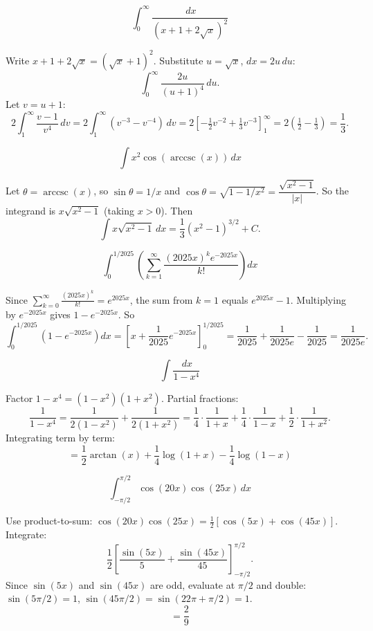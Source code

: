 \begin{questions}

\question
\[ \int_0^\infty \frac{\,dx}{(x+1+2\sqrt{x})^2} \]
\begin{solution}
Write $x+1+2\sqrt{x}=(\sqrt{x}+1)^2$. Substitute $u=\sqrt{x}$, $dx=2u\,du$:
\[ \int_0^\infty \frac{2u}{(u+1)^4}\,du. \]
Let $v=u+1$: 
\[
2\int_1^\infty \frac{v-1}{v^4}\,dv = 2\int_1^\infty (v^{-3}-v^{-4})\,dv = 2\left[-\tfrac12 v^{-2}+\tfrac13 v^{-3}\right]_1^\infty = 2\left(\tfrac12-\tfrac13\right)=\frac13.\]
\end{solution}

\question
\[ \int x^2\cos(\operatorname{arccsc}(x))\,dx \]
\begin{solution}
Let $\theta=\operatorname{arccsc}(x)$, so $\sin\theta=1/x$ and $\cos\theta=\sqrt{1-1/x^2}=\dfrac{\sqrt{x^2-1}}{|x|}$.
So the integrand is $x\sqrt{x^2-1}$ (taking $x>0$). Then
\[ \int x\sqrt{x^2-1}\,dx = \frac13(x^2-1)^{3/2}+C. \]
\end{solution}

\question
\[ \int_0^{1/2025}\left(\sum_{k=1}^\infty \frac{(2025x)^k e^{-2025x}}{k!}\right)dx \]
\begin{solution}
Since $\sum_{k=0}^\infty \frac{(2025x)^k}{k!}=e^{2025x}$, the sum from $k=1$ equals $e^{2025x}-1$. Multiplying by $e^{-2025x}$ gives $1-e^{-2025x}$. So
\[ \int_0^{1/2025}\left(1-e^{-2025x}\right)dx = \left[x+\frac{1}{2025}e^{-2025x}\right]_0^{1/2025} = \frac{1}{2025}+\frac{1}{2025e}-\frac{1}{2025}=\frac{1}{2025e}. \]
\end{solution}

\question
\[ \int \frac{\,dx}{1-x^4} \]
\begin{solution}
Factor $1-x^4=(1-x^2)(1+x^2)$. Partial fractions:
\[ \frac{1}{1-x^4}=\frac{1}{2(1-x^2)}+\frac{1}{2(1+x^2)} = \frac{1}{4}\cdot\frac{1}{1+x}+\frac14\cdot\frac{1}{1-x}+\frac12\cdot\frac{1}{1+x^2}.\]
Integrating term by term:
\[ = \frac12\arctan(x)+\frac14\log(1+x)-\frac14\log(1-x) \]
\end{solution}

\question
\[ \int_{-\pi/2}^{\pi/2}\cos(20x)\cos(25x)\,dx \]
\begin{solution}
Use product-to-sum: $\cos(20x)\cos(25x)=\tfrac12[\cos(5x)+\cos(45x)]$. Integrate:
\[ \frac12\left[\frac{\sin(5x)}{5}+\frac{\sin(45x)}{45}\right]_{-\pi/2}^{\pi/2}. \]
Since $\sin(5x)$ and $\sin(45x)$ are odd, evaluate at $\pi/2$ and double:
$\sin(5\pi/2)=1$, $\sin(45\pi/2)=\sin(22\pi+\pi/2)=1$.
\[ = \frac29 \]
\end{solution}


\end{questions}
